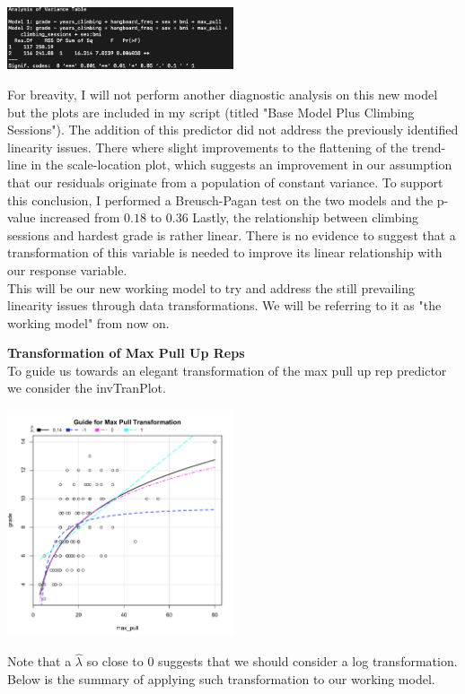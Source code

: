 \documentclass[11pt]{amsart}
\begin{document}
\begin{center}
\includegraphics[width=0.5\textwidth]{anova1}
\end{center}

For breavity, I will not perform another diagnostic analysis on this new model but the plots are included in my script (titled "Base Model Plus Climbing Sessions").
The addition of this predictor did not address the previously identified linearity issues.
There where slight improvements to the flattening of the trend-line in the scale-location plot, which suggests an improvement in our assumption that our residuals originate from a population of constant variance.
To support this conclusion, I performed a Breusch-Pagan test on the two models and the p-value increased from $0.18$ to $0.36$
Lastly, the relationship between climbing sessions and hardest grade is rather linear.
There is no evidence to suggest that a transformation of this variable is needed to improve its linear relationship with our response variable.\\

This will be our new working model to try and address the still prevailing linearity issues through data transformations.
We will be referring to it as "the working model" from now on. 

\newpage
{\bf\large Transformation of Max Pull Up Reps}\\
To guide us towards an elegant transformation of the max pull up rep predictor we consider the invTranPlot.
\begin{center}
\includegraphics[width=0.5\textwidth]{tran1}
\end{center}
Note that a $\hat\lambda$ so close to $0$ suggests that we should consider a log transformation.
Below is the summary of applying such transformation to our working model.\\
\end{document}
